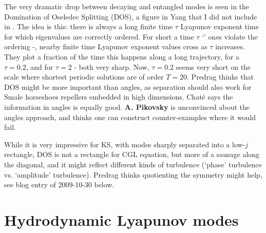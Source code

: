 \begin{description}
The very dramatic drop between decaying and entangled modes is
seen in the Domination of Oseledec Splitting (DOS), a figure in
Yang \etal{} that I did not include in
. The idea is this: there is always a
long finite time $\tau$ Lyapunov exponent time for which
eigenvalues are correctly ordered. For short a time $\tau$
`{\entangled}' ones violate the ordering -\ie, nearby finite time
Lyapunov exponent values cross as $\tau$ increases. They plot a
fraction of the time this happens along a long trajectory, for
a $\tau=0.2$, and for $\tau=2$ - both very sharp. Now,
$\tau=0.2$ seems very short on the scale where shortest
periodic solutions are of order $T=20$. Predrag thinks that DOS
might be more important than angles, as separation should also
work for Smale horseshoes repellers embedded in high
dimensions. Chat\'e says the information in angles is equally
good. {\bf A. Pikovsky} is unconvinced about the angles
approach, and thinks one can construct counter-examples where
it would fail.

While it is very impressive for KS, with {\entangled} modes sharply
separated into a low-$j$ rectangle, DOS is not a rectangle for
CGL equation, but more of a sausage along the diagonal, and it
might reflect different kinds of turbulence (`phase' turbulence
vs. `amplitude' turbulence). Predrag thinks quotienting the
symmetry might help, see blog entry of 2009-10-30 below.



\end{description}

\section{Hydrodynamic Lyapunov modes}
\label{sect:HDLmodes}

